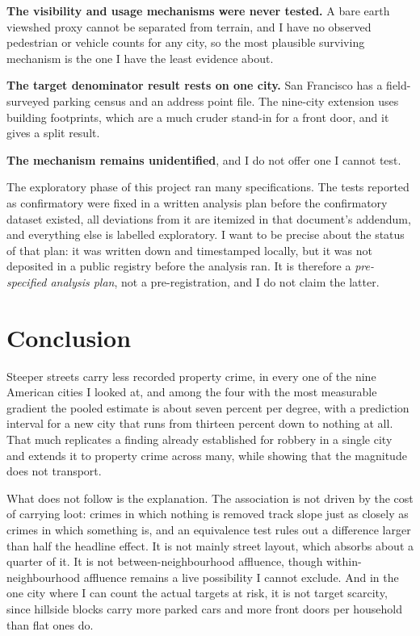 \documentclass[12pt,letterpaper]{article}
\begin{document}
\textbf{The visibility and usage mechanisms were never tested.} A bare earth viewshed
proxy cannot be separated from terrain, and I have no observed pedestrian or vehicle
counts for any city, so the most plausible surviving mechanism is the one I have the
least evidence about.

\textbf{The target denominator result rests on one city.} San Francisco has a
field-surveyed parking census and an address point file. The nine-city extension uses
building footprints, which are a much cruder stand-in for a front door, and it gives a
split result.

\textbf{The mechanism remains unidentified}, and I do not offer one I cannot test.

The exploratory phase of this project ran many specifications. The tests reported as
confirmatory were fixed in a written analysis plan before the confirmatory dataset
existed, all deviations from it are itemized in that document's addendum, and
everything else is labelled exploratory. I want to be precise about the status of that
plan: it was written down and timestamped locally, but it was not deposited in a
public registry before the analysis ran. It is therefore a \emph{pre-specified
analysis plan}, not a pre-registration, and I do not claim the latter.

\section{Conclusion}

Steeper streets carry less recorded property crime, in every one of the nine American
cities I looked at, and among the four with the most measurable gradient the pooled
estimate is about seven percent per degree, with a prediction interval for a new city
that runs from thirteen percent down to nothing at all. That much replicates a finding
already established for robbery in a single city and extends it to property crime
across many, while showing that the magnitude does not transport.

What does not follow is the explanation. The association is not driven by the cost of
carrying loot: crimes in which nothing is removed track slope just as closely as
crimes in which something is, and an equivalence test rules out a difference larger
than half the headline effect. It is not mainly street layout, which absorbs about a
quarter of it. It is not between-neighbourhood affluence, though within-neighbourhood
affluence remains a live possibility I cannot exclude. And in the one city where I can
count the actual targets at risk, it is not target scarcity, since hillside blocks
carry more parked cars and more front doors per household than flat ones do.
\end{document}
